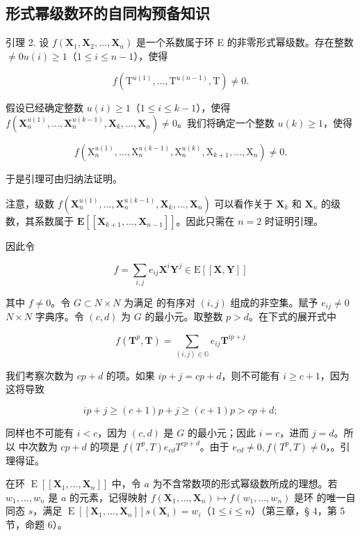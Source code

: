 \subsection{形式幂级数环的自同构预备知识}

引理 2. 设 \(f(\mathbf{X}_1, \mathbf{X}_2, \ldots, \mathbf{X}_n)\) 是一个系数属于环 E 的非零形式幂级数。存在整数 \(\neq 0\)\(u(i) \geqslant 1\)（\(1 \leqslant i \leqslant n - 1\)），使得

\[
f (\mathrm{T} ^ {u (1)}, \dots , \mathrm{T} ^ {u (n - 1)}, \mathrm{T}) \neq 0.
\]

假设已经确定整数 \(u(i) \geqslant 1\)（\(1 \leqslant i \leqslant k - 1\)），使得 \(f(\mathbf{X}_n^{u(1)}, \ldots, \mathbf{X}_n^{u(k-1)}, \mathbf{X}_k, \ldots, \mathbf{X}_n) \neq 0\)。我们将确定一个整数 \(u(k) \geqslant 1\)，使得

\[
f \left(\mathrm{X} _ {n} ^ {u (1)}, \dots , \mathrm{X} _ {n} ^ {u (k - 1)}, \mathrm{X} _ {n} ^ {u (k)}, \mathrm{X} _ {k + 1}, \dots , \mathrm{X} _ {n}\right) \neq 0.
\]

于是引理可由归纳法证明。

注意，级数 \(f(\mathbf{X}_n^{u(1)}, \ldots, \mathbf{X}_n^{u(k-1)}, \mathbf{X}_k, \ldots, \mathbf{X}_n)\) 可以看作关于 \(\mathbf{X}_k\) 和 \(\mathbf{X}_n\) 的级数，其系数属于 \(\mathbf{E}[[\mathbf{X}_{k+1}, \ldots, \mathbf{X}_{n-1}]]\)。因此只需在 \(n = 2\) 时证明引理。

因此令

\[
f = \sum_ {i, j} e _ {i j} \mathbf {X} ^ {i} \mathbf {Y} ^ {j} \in \mathrm{E} [ [ \mathbf {X}, \mathbf {Y} ] ]
\]

其中 \(f \neq 0\)。令 \(G \subset N \times N\) 为满足  的有序对 \((i, j)\) 组成的非空集。赋予 \(e_{ij} \neq 0\)\(N \times N\) 字典序。令 \((c, d)\) 为 \(G\) 的最小元。取整数 \(p > d\)。在下式的展开式中

\[
f (\mathbf {T} ^ {p}, \mathbf {T}) = \sum_ {(i, j) \in \mathbb {G}} e _ {i j} \mathbf {T} ^ {i p + j}
\]

我们考察次数为 \(cp + d\) 的项。如果 \(ip + j = cp + d\)，则不可能有 \(i \geqslant c + 1\)，因为这将导致

\[
i p + j \geqslant (c + 1) p + j \geqslant (c + 1) p > c p + d;
\]

同样也不可能有 \(i < c\)，因为 \((c, d)\) 是 \(G\) 的最小元；因此 \(i = c\)，进而 \(j = d\)。所以  中次数为 \(cp + d\) 的项是 \(f(T^p, T)\)\(e_{cd}T^{cp + d}\)。由于 \(e_{cd} \neq 0, f(T^p, T) \neq 0\)，。引理得证。

在环 \(\operatorname{E}[[\mathbf{X}_1, \ldots, \mathbf{X}_n]]\) 中，令 \(a\) 为不含常数项的形式幂级数所成的理想。若 \(w_1, \ldots, w_n\) 是 \(a\) 的元素，记得映射 \(f(\mathbf{X}_1, \ldots, \mathbf{X}_n) \mapsto f(w_1, \ldots, w_n)\) 是环  的唯一自同态 \(s\)，满足 \(\operatorname{E}[[\mathbf{X}_1, \ldots, \mathbf{X}_n]]\)\(s(\mathbf{X}_i) = w_i\)（\(1 \leqslant i \leqslant n\)）（第三章，§ 4，第 5 节，命题 6）。

